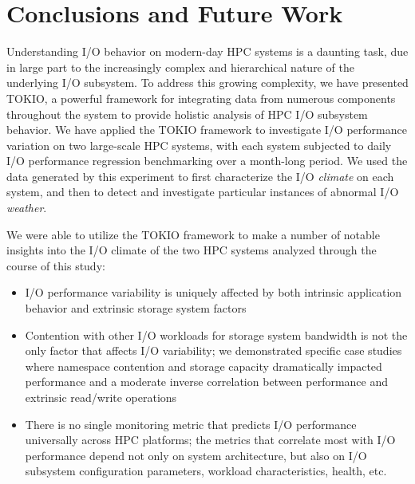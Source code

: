 \section{Conclusions and Future Work} \label{sec:conclusions}

Understanding I/O behavior on modern-day HPC systems is a daunting task, due in large part to the increasingly complex and hierarchical nature of the underlying I/O subsystem.
To address this growing complexity, we have presented TOKIO, a powerful framework for integrating data from numerous components throughout the system to provide holistic analysis of HPC I/O subsystem behavior.
We have applied the TOKIO framework to investigate I/O performance variation on two large-scale HPC systems, with each system subjected to daily I/O performance regression benchmarking over a month-long period.
We used the data generated by this experiment to first characterize the I/O \emph{climate} on each system, and then to detect and investigate particular instances of abnormal I/O \emph{weather}.

We were able to utilize the TOKIO framework to make a number of notable insights into the I/O climate of the two HPC systems analyzed through the course of this study:

\begin{itemize}
\item I/O performance variability is uniquely affected by both intrinsic application behavior and extrinsic storage system factors
\item Contention with other I/O workloads for storage system bandwidth is not the only factor that affects I/O variability; %
we demonstrated specific case studies where namespace contention and storage capacity dramatically impacted performance and a moderate inverse correlation between performance and extrinsic read/write operations
\item There is no single monitoring metric that predicts I/O performance universally across HPC platforms; the metrics that correlate most with I/O performance depend not only on system architecture, but also on I/O subsystem configuration parameters, workload characteristics, health, etc.
\end{itemize}

